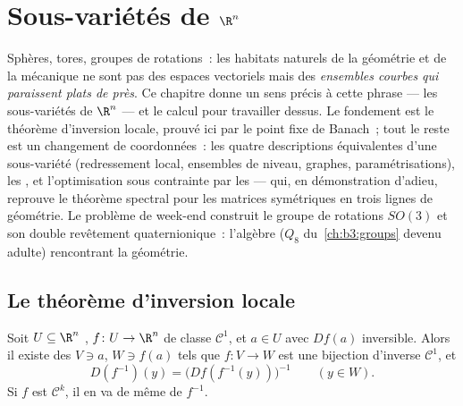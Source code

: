\chapter{Sous-variétés de \texorpdfstring{$\R^n$}{Rn}}
\label{ch:b3:submanifolds}

Sphères, tores, groupes de rotations~: les habitats naturels de
la géométrie et de la mécanique ne sont pas des espaces
vectoriels mais des \emph{ensembles courbes qui paraissent
plats de près}. Ce chapitre donne un sens précis à cette phrase
--- les sous-variétés de $\R^n$ --- et le calcul pour travailler
dessus. Le fondement est le théorème d'inversion locale, prouvé
ici par le point fixe de Banach~; tout le reste est un
changement de coordonnées~: les quatre descriptions équivalentes
d'une sous-variété (redressement local, ensembles de niveau,
graphes, paramétrisations), les , et
l'optimisation sous contrainte par les  --- qui, en démonstration d'adieu, reprouve le théorème
spectral pour les matrices symétriques en trois lignes de
géométrie. Le problème de week-end construit le groupe de
rotations $SO(3)$ et son double revêtement quaternionique~:
l'algèbre ($Q_8$ du~\cref{ch:b3:groups} devenu adulte)
rencontrant la géométrie.

\section{Le théorème d'inversion locale}

\begin{theorem}
\label{thm:b3:submanifolds:ift}
Soit $U \subseteq \R^n$ , $f \colon U \to \R^n$ de
classe $\mathcal C^1$, et $a \in U$ avec $Df(a)$ inversible.
Alors il existe des  $V \ni a$, $W \ni f(a)$ tels que
$f \colon V \to W$ est une bijection d'inverse $\mathcal C^1$,
et
\[
D(f^{-1})(y) = \bigl(Df(f^{-1}(y))\bigr)^{-1}
\qquad (y \in W).
\]
Si $f$ est $\mathcal C^k$, il en va de même de $f^{-1}$.
\end{theorem}

